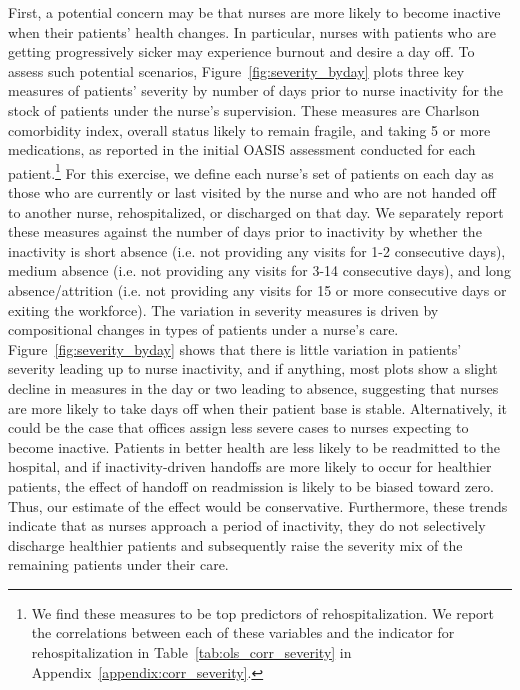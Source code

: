\documentclass[final,12pt, notitlepage]{article}
\begin{document}
First, a potential concern may be that nurses are more likely to become inactive when their patients' health changes. In particular, nurses with patients who are getting progressively sicker may experience burnout and desire a day off. To assess such potential scenarios, Figure~\ref{fig:severity_byday} plots three key measures of patients' severity by number of days prior to nurse inactivity for the stock of patients under the nurse's supervision.
These measures are Charlson comorbidity index, overall status likely to remain fragile, and taking 5 or more medications, as reported in the initial OASIS assessment conducted for each patient.\footnote{We find these measures to be top predictors of rehospitalization. We report the correlations between each of these variables and the indicator for rehospitalization in Table~\ref{tab:ols_corr_severity} in Appendix~\ref{appendix:corr_severity}.}
For this exercise, we define each nurse's set of patients on each day as those who are currently or last visited by the nurse and who are not handed off to another nurse, rehospitalized, or discharged on that day. We separately report these measures against the number of days prior to inactivity by whether the inactivity is short absence (i.e. not providing any visits for 1-2 consecutive days), medium absence (i.e. not providing any visits for 3-14 consecutive days), and long absence/attrition (i.e. not providing any visits for 15 or more consecutive days or exiting the workforce).
The variation in severity measures is driven by compositional changes in types of patients under a nurse's care.
Figure~\ref{fig:severity_byday} shows that there is little variation in patients' severity leading up to nurse inactivity, and if anything, most plots show a slight decline in measures in the day or two leading to absence, suggesting that nurses are more likely to take days off when their patient base is stable.
Alternatively, it could be the case that offices assign less severe cases to nurses expecting to become inactive. Patients in better health are less likely to be readmitted to the hospital, and if inactivity-driven handoffs are more likely to occur for healthier patients, the effect of handoff on readmission is likely to be biased toward zero. Thus, our estimate of the effect would be conservative.
Furthermore, these trends indicate that as nurses approach a period of inactivity, they do not selectively discharge healthier patients and subsequently raise the severity mix of the remaining patients under their care.
\end{document}
